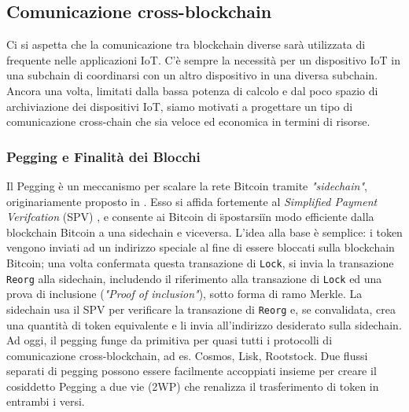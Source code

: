 \subsection{Comunicazione cross-blockchain}
Ci si aspetta che la comunicazione tra blockchain diverse sarà utilizzata di frequente nelle applicazioni IoT. C'è sempre la necessità per un dispositivo IoT in una subchain di coordinarsi con un altro dispositivo in una diversa subchain. Ancora una volta, limitati dalla bassa potenza di calcolo e dal poco spazio di archiviazione dei dispositivi IoT, siamo motivati a progettare un tipo di comunicazione cross-chain che sia veloce ed economica in termini di risorse.

\subsubsection{Pegging e Finalità dei Blocchi}
Il Pegging è un meccanismo per scalare la rete Bitcoin tramite \emph{"sidechain"}, originariamente
proposto in \cite{c1}. Esso si affida fortemente al \emph{Simplified Payment Verifcation} (SPV) \cite{c21}, e consente ai Bitcoin di \"spostarsi\" in modo efficiente dalla blockchain Bitcoin a una sidechain
e viceversa. L'idea alla base è semplice: i token vengono inviati ad un indirizzo speciale al fine di essere bloccati sulla blockchain Bitcoin; una volta confermata questa transazione di \texttt{Lock}, si invia la transazione \texttt{Reorg} alla sidechain, includendo il riferimento alla transazione di \texttt{Lock} ed una prova di inclusione (\emph{"Proof of inclusion"}), sotto forma di ramo Merkle. La sidechain usa il SPV per verificare la transazione di \texttt{Reorg} e, se convalidata, crea una quantità di token equivalente e li invia all'indirizzo desiderato sulla sidechain. Ad oggi, il pegging funge da
primitiva per quasi tutti i protocolli di comunicazione cross-blockchain, ad es. Cosmos, Lisk,
Rootstock. Due flussi separati di pegging possono essere facilmente accoppiati insieme per creare il
cosiddetto Pegging a due vie (2WP) che renalizza il trasferimento di token in entrambi i versi.

